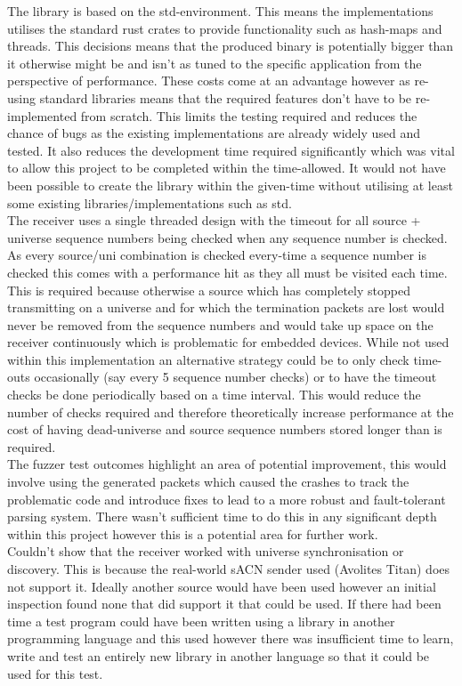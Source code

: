 \documentclass[11pt,a4paper]{article}
\begin{document}
The library is based on the std-environment. This means the implementations utilises the standard rust crates to provide functionality such as hash-maps and threads. This decisions means that the produced binary is potentially bigger than it otherwise might be and isn't as tuned to the specific application from the perspective of performance. These costs come at an advantage however as re-using standard libraries means that the required features don't have to be re-implemented from scratch. This limits the testing required and reduces the chance of bugs as the existing implementations are already widely used and tested. It also reduces the development time required significantly which was vital to allow this project to be completed within the time-allowed. It would not have been possible to create the library within the given-time without utilising at least some existing libraries/implementations such as std.\\

The receiver uses a single threaded design with the timeout for all source + universe sequence numbers being checked when any sequence number is checked. As every source/uni combination is checked every-time a sequence number is checked this comes with a performance hit as they all must be visited each time. This is required because otherwise a source which has completely stopped transmitting on a universe and for which the termination packets are lost would never be removed from the sequence numbers and would take up space on the receiver continuously which is problematic for embedded devices. While not used within this implementation an alternative strategy could be to only check time-outs occasionally (say every 5 sequence number checks) or to have the timeout checks be done periodically based on a time interval. This would reduce the number of checks required and therefore theoretically increase performance at the cost of having dead-universe and source sequence numbers stored longer than is required.\\

The fuzzer test outcomes highlight an area of potential improvement, this would involve using the generated packets which caused the crashes to track the problematic code and introduce fixes to lead to a more robust and fault-tolerant parsing system. There wasn't sufficient time to do this in any significant depth within this project however this is a potential area for further work. \\

Couldn't show that the receiver worked with universe synchronisation or discovery. This is because the real-world sACN sender used (Avolites Titan) does not support it. Ideally another source would have been used however an initial inspection found none that did support it that could be used. If there had been time a test program could have been written using a library in another programming language and this used however there was insufficient time to learn, write and test an entirely new library in another language so that it could be used for this test. \\
\end{document}
